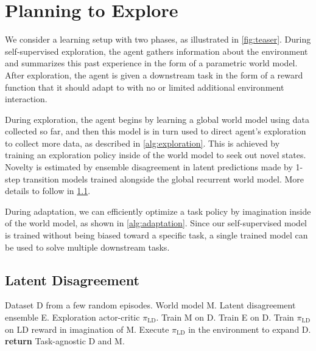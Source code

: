 \documentclass{article}
\begin{document}
%
%
%
%

%

\section{Planning to Explore}
We consider a learning setup with two phases, as illustrated in \cref{fig:teaser}. During self-supervised exploration, the agent gathers information about the environment and summarizes this past experience in the form of a parametric world model. After exploration, the agent is given a downstream task in the form of a reward function that it should adapt to with no or limited additional environment interaction.

During exploration, the agent begins by learning a global world model using data collected so far, and then this model is in turn used to direct agent's exploration to collect more data, as described in \cref{alg:exploration}. This is achieved by training an exploration policy inside of the world model to seek out novel states. Novelty is estimated by ensemble disagreement in latent predictions made by 1-step transition models trained alongside the global recurrent world model. More details to follow in \cref{sec:disagreement}.

During adaptation, we can efficiently optimize a task policy by imagination inside of the world model, as shown in \cref{alg:adaptation}. Since our self-supervised model is trained without being biased toward a specific task, a single trained model can be used to solve multiple downstream tasks.

\subsection{Latent Disagreement}
\label{sec:disagreement}

\begin{algorithm}[t]
\caption{Planning to Explore via Latent Disagreement}
\label{alg:exploration}
\begin{algorithmic}[1]
\STATE {} Dataset D from a few random episodes.
\STATE \makebox[4.5em][l]{} World model M.
\STATE \makebox[4.5em][l]{} Latent disagreement ensemble E.
\STATE \makebox[4.5em][l]{} Exploration actor-critic $\pi_\mathrm{LD}$.
\STATE Train M on D.
\STATE Train E on D.
\STATE Train $\pi_\mathrm{LD}$ on LD reward in imagination of M.
\STATE Execute $\pi_\mathrm{LD}$ in the environment to expand D.
\ENDWHILE
\STATE \textbf{return} Task-agnostic D and M.
\end{algorithmic}
\end{algorithm}
\end{document}
